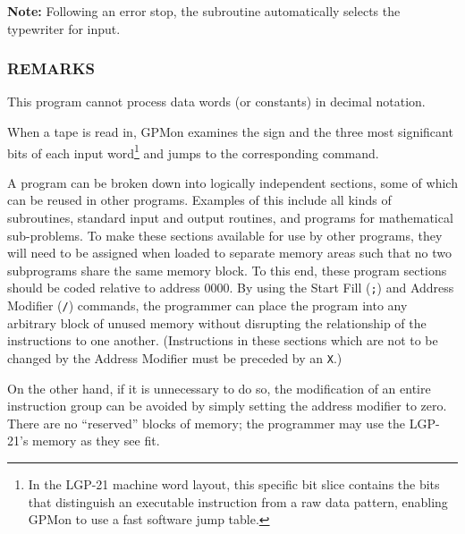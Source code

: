 \textbf{Note:} Following an error stop, the subroutine automatically selects the typewriter for input.

\subsubsection*{REMARKS}
This program cannot process data words (or constants) in decimal notation.

When a tape is read in, GPMon examines the sign and the three most significant bits of each input word\footnote{In the LGP-21 machine word layout, this specific bit slice contains the bits that distinguish an executable instruction from a raw data pattern, enabling GPMon to use a fast software jump table.} and jumps to the corresponding command.

A program can be broken down into logically independent sections, some of which can be reused in other programs. Examples of this include all kinds of subroutines, standard input and output routines, and programs for mathematical sub-problems. To make these sections available for use by other programs, they will need to be assigned when loaded to separate memory areas such that no two subprograms share the same memory block. To this end, these program sections should be coded relative to address 0000. By using the Start Fill (\texttt{;}) and Address Modifier (\texttt{/}) commands, the programmer can place the program into any arbitrary block of unused memory without disrupting the relationship of the instructions to one another. (Instructions in these sections which are not to be changed by the Address Modifier must be preceded by an \texttt{X}.)

On the other hand, if it is unnecessary to do so, the modification of an entire instruction group can be avoided by simply setting the address modifier to zero. There are no ``reserved'' blocks of memory; the programmer may use the LGP-21's memory as they see fit.

